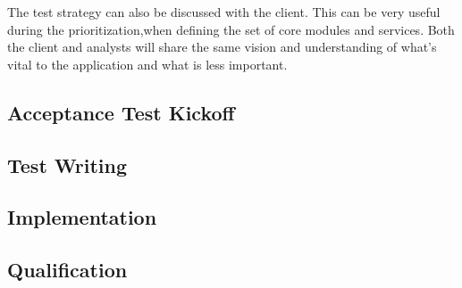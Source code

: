 The test strategy can also be discussed with the client.
This can be very useful during the prioritization,when defining the set of
core modules and services.
Both the client and analysts will share the same vision and understanding of
what's vital to the application and what is less important.

\subsection{Acceptance Test Kickoff}\label{subsec:acceptance-test-kickoff}

\subsection{Test Writing}\label{subsec:test-writing}

\subsection{Implementation}\label{subsec:implementation}

\subsection{Qualification}\label{subsec:qualification}
